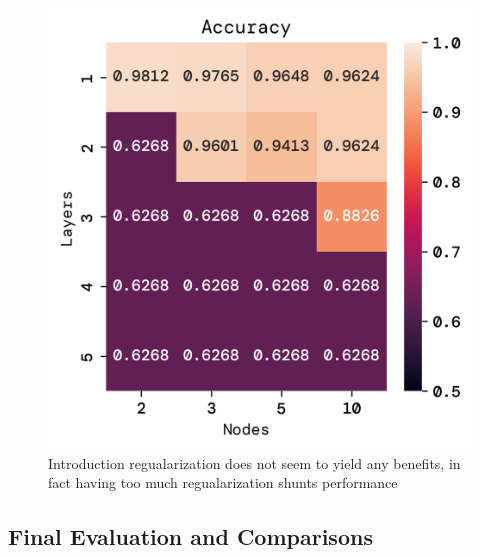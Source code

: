 \documentclass[twoside,11pt]{report}
\begin{document}
\begin{figure}[!ht]
\begin{minipage}[t]{0.5\textwidth - 1mm}
\begin{center}
                \includegraphics[width=\textwidth]{../runsAndFigures/accuracy_layers_nodes.png}
            \end{center}
            \caption{Introduction regualarization does not seem to yield any benefits, in fact
            having too much regualarization shunts performance}\label{fig:accuracy_aplha}
        \end{minipage}
    \end{figure}



\subsection{Final Evaluation and Comparisons}
\label{sec:comparisons}
\end{document}
